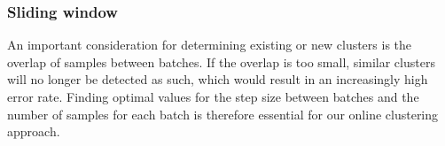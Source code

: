 \subsubsection{Sliding window}

An important consideration for determining existing or new clusters is the overlap of samples between batches. If the overlap is too small, similar clusters will no longer be detected as such, which would result in an increasingly high error rate. Finding optimal values for the step size between batches and the number of samples for each batch is therefore essential for our online clustering approach.